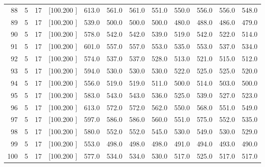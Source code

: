 \documentclass[12pt,a4paper]{article}
\begin{document}
\begin{center}
{\begin{tabular}{r r r r r r r r r r r r}
  88&  5& 17&[100.200   ]&   613.0&   561.0&   561.0&   551.0&   550.0&   556.0&   556.0&   548.0\\[-0.02in]
  89&  5& 17&[100.200   ]&   539.0&   500.0&   500.0&   500.0&   480.0&   488.0&   486.0&   479.0\\[-0.02in]
  90&  5& 17&[100.200   ]&   578.0&   542.0&   542.0&   539.0&   519.0&   542.0&   522.0&   514.0\\[-0.02in]
  91&  5& 17&[100.200   ]&   601.0&   557.0&   557.0&   553.0&   535.0&   553.0&   537.0&   534.0\\[-0.02in]
  92&  5& 17&[100.200   ]&   574.0&   537.0&   537.0&   528.0&   513.0&   521.0&   515.0&   512.0\\[-0.02in]
  93&  5& 17&[100.200   ]&   594.0&   530.0&   530.0&   530.0&   522.0&   525.0&   525.0&   520.0\\[-0.02in]
  94&  5& 17&[100.200   ]&   556.0&   519.0&   519.0&   511.0&   500.0&   514.0&   503.0&   500.0\\[-0.02in]
  95&  5& 17&[100.200   ]&   583.0&   543.0&   543.0&   536.0&   525.0&   539.0&   527.0&   523.0\\[-0.02in]
  96&  5& 17&[100.200   ]&   613.0&   572.0&   572.0&   562.0&   550.0&   568.0&   551.0&   549.0\\[-0.02in]
  97&  5& 17&[100.200   ]&   597.0&   586.0&   586.0&   560.0&   551.0&   575.0&   552.0&   535.0\\[-0.02in]
  98&  5& 17&[100.200   ]&   580.0&   552.0&   552.0&   545.0&   530.0&   549.0&   530.0&   529.0\\[-0.02in]
  99&  5& 17&[100.200   ]&   553.0&   498.0&   498.0&   498.0&   491.0&   494.0&   493.0&   490.0\\[-0.02in]
 100&  5& 17&[100.200   ]&   577.0&   534.0&   534.0&   530.0&   517.0&   525.0&   517.0&   517.0\\[-0.02in]

\hline
\end{tabular}}
\end{center}
\end{document}
